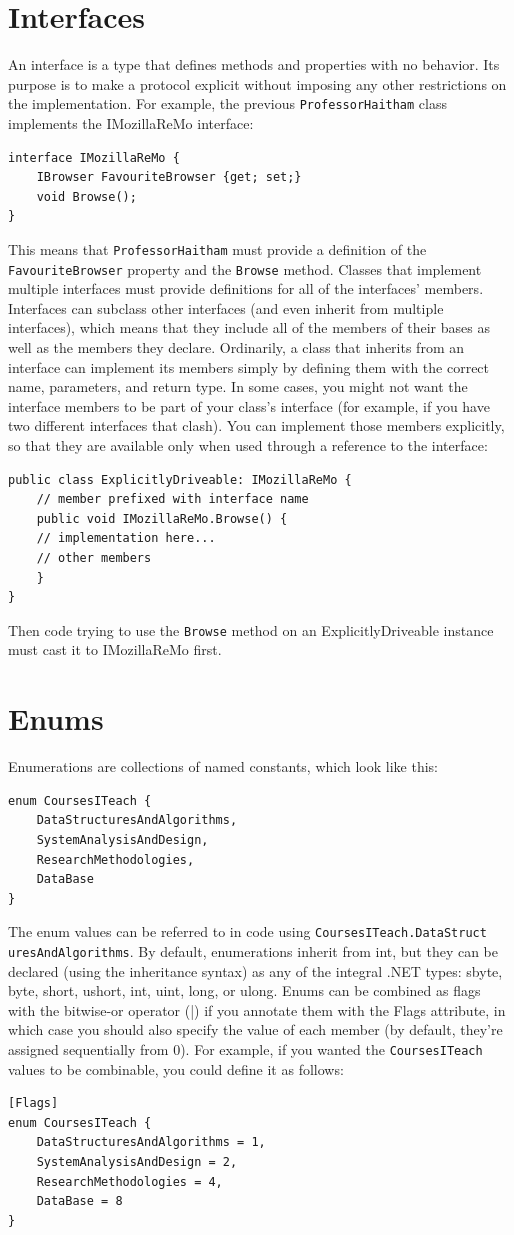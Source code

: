 \documentclass[12pt,a4paper,final,twoside,titlepage]{book}
\begin{document}
\section{Interfaces}
An interface is a type that defines methods and properties with no behavior. Its purpose is to make a protocol explicit without imposing any other restrictions on the implementation. For example, the previous \texttt{ProfessorHaitham} class implements the IMozillaReMo interface:
\begin{lstlisting}
interface IMozillaReMo {
	IBrowser FavouriteBrowser {get; set;} 
	void Browse();
}
\end{lstlisting}
This means that \texttt{ProfessorHaitham} must provide a definition of the \texttt{FavouriteBrowser} property and the \texttt{Browse} method. Classes that implement multiple interfaces must provide definitions for all of the interfaces’ members. Interfaces can subclass other interfaces (and even inherit from multiple interfaces), which means that they include all of the members of their bases as well as the members they declare.
Ordinarily, a class that inherits from an interface can implement its members simply by defining them with the correct name, parameters, and return type. In some cases, you might not want the interface members to be part of your class’s interface (for example, if you have two different interfaces that clash). You can implement those members explicitly, so that they are available only when used through a reference to the interface:
\begin{lstlisting}
public class ExplicitlyDriveable: IMozillaReMo { 
	// member prefixed with interface name 
	public void IMozillaReMo.Browse() {
	// implementation here... 
	// other members
	}
}
\end{lstlisting}
Then code trying to use the \texttt{Browse} method on an ExplicitlyDriveable instance
must cast it to IMozillaReMo first.
\section{Enums}
Enumerations are collections of named constants, which look like this:
\begin{lstlisting}
enum CoursesITeach { 
	DataStructuresAndAlgorithms,
	SystemAnalysisAndDesign, 
	ResearchMethodologies, 
	DataBase
}
\end{lstlisting}
The enum values can be referred to in code using \texttt{CoursesITeach.DataStruct\\uresAndAlgorithms}. By default, enumerations inherit from int, but they can be declared (using the inheritance syntax) as any of the integral .NET types: sbyte, byte, short, ushort, int, uint, long, or ulong. Enums can be combined as flags with the bitwise-or operator (|) if you annotate them with the Flags attribute, in which case you should also specify the value of each member (by default, they’re assigned sequentially from 0). For example, if you wanted the \texttt{CoursesITeach} values to be combinable, you could define it as follows:
\begin{lstlisting}
[Flags] 
enum CoursesITeach {
	DataStructuresAndAlgorithms = 1, 
	SystemAnalysisAndDesign = 2, 
	ResearchMethodologies = 4, 
	DataBase = 8
}
\end{lstlisting}
\end{document}
